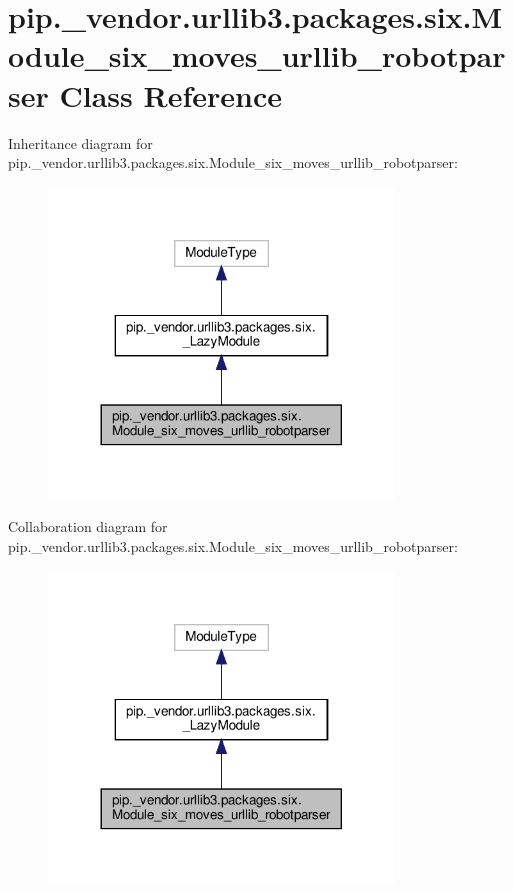 \hypertarget{classpip_1_1__vendor_1_1urllib3_1_1packages_1_1six_1_1Module__six__moves__urllib__robotparser}{}\section{pip.\+\_\+vendor.\+urllib3.\+packages.\+six.\+Module\+\_\+six\+\_\+moves\+\_\+urllib\+\_\+robotparser Class Reference}
\label{classpip_1_1__vendor_1_1urllib3_1_1packages_1_1six_1_1Module__six__moves__urllib__robotparser}


Inheritance diagram for pip.\+\_\+vendor.\+urllib3.\+packages.\+six.\+Module\+\_\+six\+\_\+moves\+\_\+urllib\+\_\+robotparser\+:
\nopagebreak
\begin{figure}[H]
\begin{center}
\leavevmode
\includegraphics[width=260pt]{classpip_1_1__vendor_1_1urllib3_1_1packages_1_1six_1_1Module__six__moves__urllib__robotparser__inherit__graph}
\end{center}
\end{figure}


Collaboration diagram for pip.\+\_\+vendor.\+urllib3.\+packages.\+six.\+Module\+\_\+six\+\_\+moves\+\_\+urllib\+\_\+robotparser\+:
\nopagebreak
\begin{figure}[H]
\begin{center}
\leavevmode
\includegraphics[width=260pt]{classpip_1_1__vendor_1_1urllib3_1_1packages_1_1six_1_1Module__six__moves__urllib__robotparser__coll__graph}
\end{center}
\end{figure}
